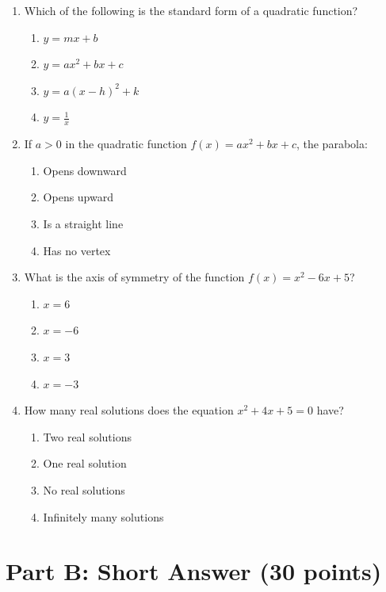 \documentclass[12pt]{article}
\begin{document}
\begin{enumerate}[label=\arabic*.]
    \item Which of the following is the standard form of a quadratic function?
    \begin{enumerate}[label=(\alph*)]
        \item $y = mx + b$
        \item $y = ax^2 + bx + c$
        \item $y = a(x - h)^2 + k$
        \item $y = \frac{1}{x}$
    \end{enumerate}

    \item If $a > 0$ in the quadratic function $f(x) = ax^2 + bx + c$, the parabola:
    \begin{enumerate}[label=(\alph*)]
        \item Opens downward
        \item Opens upward
        \item Is a straight line
        \item Has no vertex
    \end{enumerate}

    \item What is the axis of symmetry of the function $f(x) = x^2 - 6x + 5$?
    \begin{enumerate}[label=(\alph*)]
        \item $x = 6$
        \item $x = -6$
        \item $x = 3$
        \item $x = -3$
    \end{enumerate}

    \item How many real solutions does the equation $x^2 + 4x + 5 = 0$ have?
    \begin{enumerate}[label=(\alph*)]
        \item Two real solutions
        \item One real solution
        \item No real solutions
        \item Infinitely many solutions
    \end{enumerate}
\end{enumerate}

\vspace{0.5cm}

\section*{Part B: Short Answer (30 points)}
\end{document}
